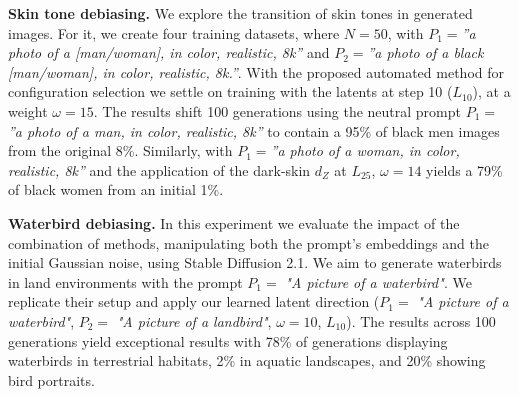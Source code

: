 

\noindent\textbf{Skin tone debiasing.} We explore the transition of skin tones in generated images. For it, we create four training datasets, where $N=50$, with $P_{1}=$\textit{”a photo of a [man/woman], in color, realistic, 8k”} and $P_{2}=$\textit{”a photo of a black [man/woman], in color, realistic, 8k.”}. With the proposed automated method for configuration selection we settle on training with the latents at step 10 ($L_{10}$), at a weight $\omega=15$. The results shift 100 generations using the neutral prompt $P_{1}=$\textit{”a photo of a man, in color, realistic, 8k”} to contain a 95\% of black men images from the original 8\%. Similarly, with $P_{1}=$\textit{”a photo of a woman, in color, realistic, 8k”} and the application of the dark-skin $d_{Z}$ at $L_{25}$, $\omega=14$ yields a 79\% of black women from an initial 1\%.

\noindent\textbf{Waterbird debiasing.} In this experiment we evaluate the impact of the combination of methods, manipulating both the prompt’s embeddings \cite{chuang2023debiasing} and the initial Gaussian noise, using Stable Diffusion 2.1. We aim to generate waterbirds in land environments with the prompt $P_{1} =$ \textit{"A picture of a waterbird"}. We replicate their setup and apply our learned latent direction ($P_{1} =$ \textit{"A picture of a waterbird"}, $P_{2} =$ \textit{"A picture of a landbird"}, $\omega=10$, $L_{10}$). The results across 100 generations yield exceptional results with 78\% of generations displaying waterbirds in terrestrial habitats, 2\% in aquatic landscapes, and 20\% showing bird portraits.



